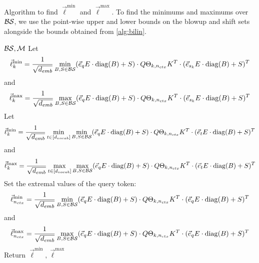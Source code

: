 \begin{algorithm}[h] 
	\caption{
        Algorithm to find $\vec{\ell}^{\min}$ and $ \vec{\ell}^{\max}$.
        To find the minimums and maximums over $\mathcal{B} \mathcal{S}$, we use the point-wise upper and lower bounds on the blowup and shift sets alongside the bounds obtained from \cref{alg:bilin}.}
	\label{alg:lminlmax}
	\begin{algorithmic}
		  $\mathcal{B}\mathcal{S}, \mathcal{M}$
		\STATE
		\STATE Let \begin{align*}
		\vec{\ell}^{\min}_k = \frac{1}{\sqrt{{d_{emb}}}} \min_{B, S  \in \mathcal{B}\mathcal{S}} (\vec{e}_{q} E \cdot \mathrm{diag}(B) + S) \cdot Q \Theta_{k, {n_{ctx}}} 
		K^T \cdot  (\vec{e}_{{s}_k} E \cdot  \mathrm{diag}(B) + S)^T
		\end{align*}
		and 
		\[
		\vec{\ell}^{\max}_k = \frac{1}{\sqrt{{d_{emb}}}}  \max_{B, S \in \mathcal{B}\mathcal{S}} (\vec{e}_{q} E \cdot \mathrm{diag}(B) + S) \cdot Q \Theta_{k, {n_{ctx}}} K^T \cdot  (\vec{e}_{{s}_k} E \cdot  \mathrm{diag}(B) + S)^T
		\]
		\ENDFOR
		\STATE
		\STATE Let \[
		\vec{\ell}^{\min}_k = \frac{1}{\sqrt{{d_{emb}}}} \min_{t \in [{d_{vocab}}]} \min_{B, S \in \mathcal{B}\mathcal{S}} (\vec{e}_q E \cdot \mathrm{diag}(B) + S) \cdot Q \Theta_{k, {n_{ctx}}} K^T \cdot  (\vec{e}_t E \cdot  \mathrm{diag}(B) + S)^T
		\]
		and 
		\[
		\vec{\ell}^{\max}_k = \frac{1}{\sqrt{{d_{emb}}}} \max_{t \in [{d_{vocab}}]} \max_{B, S \in \mathcal{B}\mathcal{S}} (\vec{e}_q E \cdot \mathrm{diag}(B) + S) \cdot Q \Theta_{k, {n_{ctx}}} K^T \cdot  (\vec{e}_t E \cdot  \mathrm{diag}(B) + S)^T
		\]
		\ENDFOR
		\STATE
		\STATE Set the extremal values of the query token:
		\[
		\vec{\ell}^{\min}_{n_{ctx}} = \frac{1}{\sqrt{{d_{emb}}}} \min_{B, S \in \mathcal{B}\mathcal{S}} (\vec{e}_{q} E \cdot \mathrm{diag}(B) + S) \cdot Q \Theta_{k, {n_{ctx}}} K^T \cdot  (\vec{e}_{q} E \cdot  \mathrm{diag}(B) + S)^T
		\]
		and
		\[
		\vec{\ell}^{\max}_{n_{ctx}} = \frac{1}{\sqrt{{d_{emb}}}}  \max_{B, S \in \mathcal{B}\mathcal{S}} (\vec{e}_{q} E \cdot \mathrm{diag}(B) + S) \cdot Q \Theta_{k, {n_{ctx}}} K^T \cdot  (\vec{e}_{q} E \cdot  \mathrm{diag}(B) + S)^T
		\]
		\STATE
		\STATE Return $\vec{\ell}^{\min}, \vec{\ell}^{\max}$
	\end{algorithmic}
\end{algorithm}


